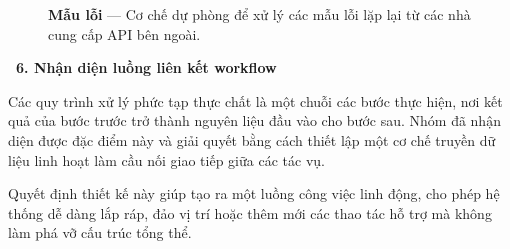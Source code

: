 \documentclass[12pt, a4paper]{article}
\begin{document}
\begin{figure}[H]
    \centering
    \caption{\textbf{Mẫu lỗi} --- Cơ chế dự phòng để xử lý các mẫu lỗi lặp lại từ các nhà cung cấp API bên ngoài.}
\end{figure}

\vspace{0.4cm}
\noindent\textcolor{brown!80!black}{\textbf{\faProjectDiagram \ 6. Nhận diện luồng liên kết workflow}}
\vspace{0.15cm}

\begin{tcolorbox}[blanker, borderline west={3pt}{0pt}{brown!60!black}, left=12pt, top=2pt, bottom=2pt]
Các quy trình xử lý phức tạp thực chất là một chuỗi các bước thực hiện, nơi kết quả của bước trước trở thành nguyên liệu đầu vào cho bước sau. Nhóm đã nhận diện được đặc điểm này và giải quyết bằng cách thiết lập một cơ chế truyền dữ liệu linh hoạt làm cầu nối giao tiếp giữa các tác vụ.

\vspace{0.15cm}
\noindent Quyết định thiết kế này giúp tạo ra một luồng công việc linh động, cho phép hệ thống dễ dàng lắp ráp, đảo vị trí hoặc thêm mới các thao tác hỗ trợ mà không làm phá vỡ cấu trúc tổng thể.
\end{tcolorbox}
\end{document}
